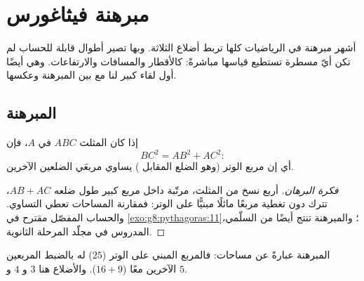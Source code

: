\chapter{مبرهنة فيثاغورس}\label{ch:g8:pythagoras}

أشهر مبرهنة في الرياضيات كلها تربط أضلاع  الثلاثة. وبها تصير أطوال قابلة للحساب لم تكن أيّ مسطرة
تستطيع قياسها مباشرةً: كالأقطار والمسافات والارتفاعات. وهي أيضًا
أول لقاء كبير لنا مع  بين المبرهنة
وعكسها.

\section{المبرهنة}

\begin{theorem}[فيثاغورس]\label{thm:g8:pythagoras:direct}
إذا كان المثلث $ABC$  في $A$، فإن
\[
BC^2 = AB^2 + AC^2 :
\]
أي إن مربع الوتر (وهو الضلع المقابل )
يساوي  مربعَي الضلعين الآخرين.
\end{theorem}

\begin{proof}[فكرة البرهان]
أربع نسخ من المثلث، مرتّبة داخل مربع كبير طول ضلعه
$AB + AC$، تترك دون تغطية مربعًا مائلًا مبنيًّا على الوتر:
فمقارنة المساحات تعطي التساوي. والحساب المفصّل
مقترح في \cref{exo:g8:pythagoras:11}؛ والمبرهنة تنتج أيضًا
من  السلّمي، المدروس في مجلّد المرحلة الثانوية.
\end{proof}

\begin{omfigure}

{\small المبرهنة عبارةً عن مساحات: فالمربع المبني على
الوتر ($25$) له بالضبط  المربعين الآخرين
معًا ($16 + 9$). والأضلاع هنا $3$ و $4$ و $5$.}
\end{omfigure}

